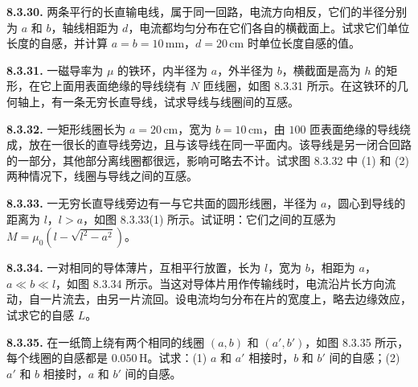 \vfill
\newpage

\textbf{8.3.30.} 两条平行的长直输电线，属于同一回路，电流方向相反，它们的半径分别为 $a$ 和 $b$，轴线相距为 $d$，电流都均匀分布在它们各自的横截面上。试求它们单位长度的自感，并计算 $a = b = 10\,\mathrm{mm}$，$d = 20\,\mathrm{cm}$ 时单位长度自感的值。

\vfill
\newpage

\textbf{8.3.31.} 一磁导率为 $\mu$ 的铁环，内半径为 $a$，外半径为 $b$，横截面是高为 $h$ 的矩形，在它上面用表面绝缘的导线绕有 $N$ 匝线圈，如图 8.3.31 所示。在这铁环的几何轴上，有一条无穷长直导线，试求导线与线圈间的互感。

\begin{center}
\end{center}

\vfill
\newpage

\textbf{8.3.32.} 一矩形线圈长为 $a = 20\,\mathrm{cm}$，宽为 $b = 10\,\mathrm{cm}$，由 $100$ 匝表面绝缘的导线绕成，放在一很长的直导线旁边，且与该导线在同一平面内。该导线是另一闭合回路的一部分，其他部分离线圈都很远，影响可略去不计。试求图 8.3.32 中 (1) 和 (2) 两种情况下，线圈与导线之间的互感。

\begin{center}
\end{center}

\vfill
\newpage

\textbf{8.3.33.} 一无穷长直导线旁边有一与它共面的圆形线圈，半径为 $a$，圆心到导线的距离为 $l$，$l > a$，如图 8.3.33(1) 所示。试证明：它们之间的互感为 $M = \mu_{0}(l - \sqrt{l^{2} - a^{2}})$。

\begin{center}
\end{center}

\vfill
\newpage

\textbf{8.3.34.} 一对相同的导体薄片，互相平行放置，长为 $l$，宽为 $b$，相距为 $a$，$a \ll b \ll l$，如图 8.3.34 所示。当这对导体片用作传输线时，电流沿片长方向流动，自一片流去，由另一片流回。设电流均匀分布在片的宽度上，略去边缘效应，试求它的自感 $L$。

\begin{center}
\end{center}

\vfill
\newpage

\textbf{8.3.35.} 在一纸筒上绕有两个相同的线圈 $(a,b)$ 和 $(a',b')$，如图 8.3.35 所示，每个线圈的自感都是 $0.050\,\mathrm{H}$。试求：(1) $a$ 和 $a'$ 相接时，$b$ 和 $b'$ 间的自感；(2) $a'$ 和 $b$ 相接时，$a$ 和 $b'$ 间的自感。

